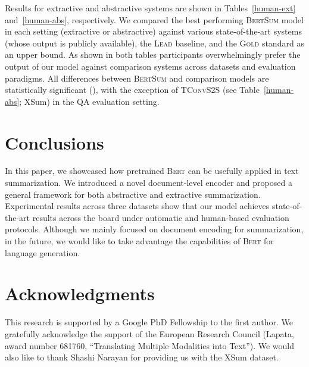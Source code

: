 \documentclass[11pt,a4paper]{article}
\begin{document}
    
    Results for extractive and abstractive systems are shown in
    Tables~\ref{human-ext} and~\ref{human-abs}, respectively.  We compared
    the best performing \textsc{BertSum} model in each setting (extractive
    or abstractive) against various state-of-the-art systems (whose output
    is publicly available), the \textsc{Lead} baseline, and the
    \textsc{Gold} standard as an upper bound. As shown in both tables
    participants overwhelmingly prefer the output of our model against
    comparison systems across datasets and evaluation paradigms. All
    differences between \textsc{BertSum} and comparison models are
    statistically significant (\mbox{}), with the exception of
    \textsc{TConvS2S} (see Table~\ref{human-abs}; XSum) in the QA
    evaluation setting.
    
    
    
    \section{Conclusions}
    \label{sec:conclusions}
    
    
    
    In this paper, we showcased how pretrained \textsc{Bert} can be
    usefully applied in text summarization. We introduced a novel
    document-level encoder and proposed a general framework for both
    abstractive and extractive summarization. Experimental results across
    three datasets show that our model achieves state-of-the-art results
    across the board under automatic and human-based evaluation
    protocols. Although we mainly focused on document encoding for
    summarization, in the future, we would like to take advantage the
    capabilities of \textsc{Bert} for language generation.
    


    


    


      \section*{Acknowledgments} This research is supported by a Google
    PhD Fellowship to the first author.  We gratefully acknowledge the
    support of the European Research Council (Lapata, award number
    681760, ``Translating Multiple Modalities into Text'').  We would
    also like to thank Shashi Narayan for providing us with the XSum dataset.
    
    \newpage
    
    
    

    
    
\end{document}
